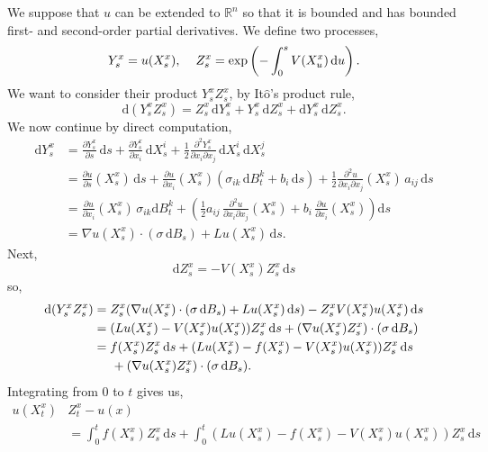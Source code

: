 \documentclass[a4paper,12pt,draft]{report}
\begin{document}
{
We suppose that $u$ can be extended to $\mathbb{R}^n$ so that it is bounded and has bounded first- and second-order partial derivatives.  We define two processes,
$$
Y_s^x = u(X_s^x), \hspace{0.4cm} Z_s^x = \exp\left(-\int_0^sV(X_u^x)\,\mathrm{d}u\right).
$$
We want to consider their product $Y_s^xZ_s^x$, by It$\mathrm{\hat{o}}$'s product rule,
$$
\mathrm{d}(Y_s^xZ_s^x) = Z_s^x\,\mathrm{d}Y_s^x + Y_s^x\,\mathrm{d}Z_s^x + \mathrm{d}Y_s^x\,\mathrm{d}Z_s^x.
$$
We now continue by direct computation,
\begin{align}
\mathrm{d}Y_s^x & = \frac{\partial Y_s^x}{\partial s}\,\mathrm{d}s + \frac{\partial Y_s^x}{\partial x_i}\,\mathrm{d}X_s^i + \frac{1}{2}\frac{\partial^2 Y_s^x}{\partial x_i \partial x_j}\,\mathrm{d}X_s^i\,\mathrm{d}X_s^j\nonumber\\
& = \frac{\partial u}{\partial s}(X_s^x)\,\mathrm{d}s + \frac{\partial u}{\partial x_i}(X_s^x)(\sigma_{ik}\,\mathrm{d}B_t^k + b_i\,\mathrm{d}s) + \frac{1}{2}\frac{\partial^2 u}{\partial x_i \partial x_j}(X_s^x)\,a_{ij}\,\mathrm{d}s\nonumber\\
& = \frac{\partial u}{\partial x_i}(X_s^x)\,\sigma_{ik}\mathrm{d}B_t^k + \left(\frac{1}{2}a_{ij}\,\frac{\partial^2 u}{\partial x_i \partial x_j}(X_s^x) + b_i\,\frac{\partial u}{\partial x_i}(X_s^x)\right)\mathrm{d}s\nonumber\\
& = \nabla u(X_s^x)\cdot(\sigma\,\mathrm{d}B_s) + Lu(X_s^x)\,\mathrm{d}s.\nonumber
\end{align}
Next,
$$
\mathrm{d}Z_s^x = -V(X_s^x)Z_s^x\,\mathrm{d}s
$$
so,
\begin{align}
\mathrm{d}(Y_s^xZ_s^x) & = Z_s^x(\nabla u(X_s^x)\cdot(\sigma\,\mathrm{d}B_s) + Lu(X_s^x)\,\mathrm{d}s) - Z_s^xV(X_s^x)u(X_s^x)\,\mathrm{d}s\nonumber\\
& = (Lu(X_s^x) - V(X_s^x)u(X_s^x))Z_s^x\,\mathrm{d}s + (\nabla u(X_s^x)Z_s^x)\cdot(\sigma\,\mathrm{d}B_s)\nonumber\\
& = f(X_s^x)Z_s^x\,\mathrm{d}s + (Lu(X_s^x) - f(X_s^x) - V(X_s^x)u(X_s^x))Z_s^x\,\mathrm{d}s \nonumber\\
& \hspace{0.5cm} + (\nabla u(X_s^x)Z_s^x)\cdot(\sigma\,\mathrm{d}B_s).\nonumber
\end{align}
Integrating from $0$ to $t$ gives us,
\begin{align}
u(X_t^x) & Z_t^x - u(x)\nonumber\\
& = \int_0^tf(X_s^x)Z_s^x\,\mathrm{d}s + \int_0^t(Lu(X_s^x) - f(X_s^x) - V(X_s^x)u(X_s^x))Z_s^x\,\mathrm{d}s\nonumber\\

\end{align}}
\end{document}
